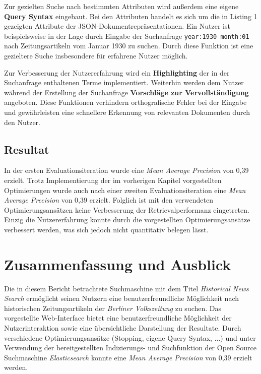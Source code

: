 \documentclass[11pt,a4paper, halfparskip]{scrartcl}
\begin{document}
Zur gezielten Suche nach bestimmten Attributen wird außerdem eine eigene \textbf{Query Syntax} eingebaut. 
Bei den Attributen handelt es sich um die in Listing 1 gezeigten Attribute der JSON-Dokumentrepräsentationen.
Ein Nutzer ist beispielsweise in der Lage durch Eingabe der Suchanfrage \texttt{year:1930 month:01} nach Zeitungsartikeln vom Januar 1930 zu suchen.
Durch diese Funktion ist eine gezieltere Suche insbesondere für erfahrene Nutzer möglich.

Zur Verbesserung der Nutzererfahrung wird ein \textbf{Highlighting} der in der Suchanfrage enthaltenen Terme implementiert.
Weiterhin werden dem Nutzer während der Erstellung der Suchanfrage \textbf{Vorschläge zur Vervollständigung} angeboten.
Diese Funktionen verhindern orthografische Fehler bei der Eingabe und gewährleisten eine schnellere Erkennung von relevanten Dokumenten durch den Nutzer.

\subsection{Resultat}

In der ersten Evaluationsiteration wurde eine \textit{Mean Average Precision} von 0,39 erzielt.
Trotz Implementierung der im vorherigen Kapitel vorgestellten Optimierungen wurde auch nach einer zweiten Evaluationsiteration eine \textit{Mean Average Precision} von 0,39 erzielt.
Folglich ist mit den verwendeten Optimierungsansätzen keine Verbesserung der Retrievalperformanz eingetreten.
Einzig die Nutzererfahrung konnte durch die vorgestellten Optimierungsansätze verbessert werden, was sich jedoch nicht quantitativ belegen lässt.

\section{Zusammenfassung und Ausblick}

Die in diesem Bericht betrachtete Suchmaschine mit dem Titel \textit{Historical News Search} ermöglicht seinen Nutzern eine benutzerfreundliche Möglichkeit nach historischen Zeitungsartikeln der \textit{Berliner Volkszeitung} zu suchen.
Das vorgestellte Web-Interface bietet eine benutzerfreundliche Möglichkeit der Nutzerinteraktion sowie eine übersichtliche Darstellung der Resultate.
Durch verschiedene Optimierungsansätze (Stopping, eigene Query Syntax, ...) und unter Verwendung der bereitgestellten Indizierungs- und Suchfunktion der Open Source Suchmaschine \textit{Elasticsearch} konnte eine \textit{Mean Average Precision} von 0,39 erzielt werden.
\end{document}
